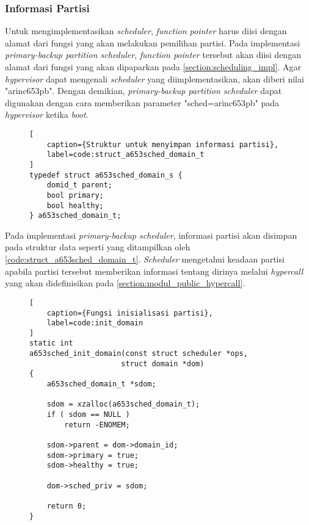 \subsubsection{Informasi Partisi}
\label{section:informasi_partisi_impl}

Untuk mengimplementasikan \textit{scheduler}, \textit{function pointer} 
harus diisi dengan alamat dari fungsi yang akan melakukan pemilihan partisi. Pada implementasi
\textit{primary-backup partition scheduler}, \textit{function pointer} tersebut akan diisi
dengan alamat dari fungsi  yang akan dipaparkan pada
\autoref{section:scheduling_impl}. Agar \textit{hypervisor} dapat mengenali \textit{scheduler}
yang diimplementasikan,  akan diberi nilai "arinc653pb". Dengan demikian,
\textit{primary-backup partition scheduler} dapat digunakan dengan cara memberikan parameter
"sched=arinc653pb" pada \textit{hypervisor} ketika \textit{boot}.

\begin{figure}[!ht]
\begin{lstlisting}[
	caption={Struktur untuk menyimpan informasi partisi},
	label=code:struct_a653sched_domain_t
]
typedef struct a653sched_domain_s {
    domid_t parent;
    bool primary;
    bool healthy;
} a653sched_domain_t;
\end{lstlisting}
\end{figure}

Pada implementasi \textit{primary-backup scheduler}, informasi partisi akan disimpan pada
struktur data seperti yang ditampilkan oleh \autoref{code:struct_a653sched_domain_t}.
\textit{Scheduler} mengetahui keadaan partisi apabila partisi tersebut memberikan informasi
tentang dirinya melalui \textit{hypercall} yang akan didefinisikan pada
\autoref{section:modul_public_hypercall}.

\begin{figure}[!hb]
\begin{lstlisting}[
	caption={Fungsi inisialisasi partisi},
	label=code:init_domain
]
static int
a653sched_init_domain(const struct scheduler *ops,
                     struct domain *dom)
{
    a653sched_domain_t *sdom;

    sdom = xzalloc(a653sched_domain_t);
    if ( sdom == NULL )
        return -ENOMEM;

    sdom->parent = dom->domain_id;
    sdom->primary = true;
    sdom->healthy = true;

    dom->sched_priv = sdom;

    return 0;
}
\end{lstlisting}
\end{figure}

